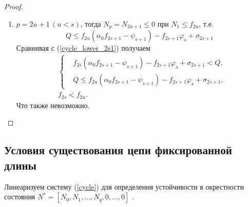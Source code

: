 \begin{proof}
\begin{enumerate}
\begin{enumerate}
            \item \(p = 2u+1 \, (u < s)\), тогда \( N_p = N_{2u+1} \leq 0 \) при \(N_1 \leq f_{2u} \), т.е. 
            \begin{equation*}
                Q \leq f_{2u} ( \alpha_0 f_{2s+1} - \psi_{s+1} ) - f_{2s+1} \varphi_s + \sigma_{2s+1}
            \end{equation*}
            Сравнивая с (\ref{cycle_lower_2s1}) получаем
            \begin{equation*}
                \begin{split}
                & \left\{ \begin{split}
                    & f_{2s} ( \alpha_0 f_{2s+1}  - \psi_{s+1} ) - f_{2s+1} \varphi_s + \sigma_{2s+1}
                    < Q, \\
                    & Q \leq f_{2u} ( \alpha_0 f_{2s+1} - \psi_{s+1} ) - f_{2s+1} \varphi_s + \sigma_{2s+1},
                \end{split} \right. \\
                & f_{2s} < f_{2u}.
                \end{split}
            \end{equation*}
            Что также невозможно. 
        \end{enumerate}
    \end{enumerate}
\end{proof}

\subsection{Условия существования цепи фиксированной длины}

Линеаризуем систему (\ref{cycle}) для определения устойчивости в окрестности состояния \(N^* = [ N_0, N_1, \dots, N_q, 0, \dots, 0 ]\) .

